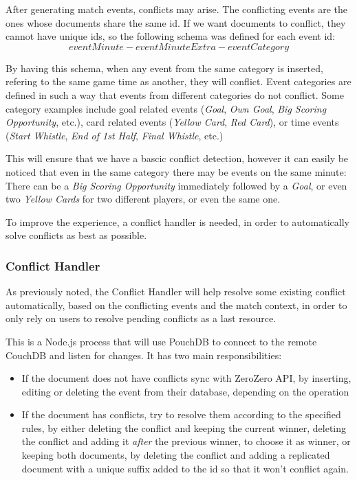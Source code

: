 After generating match events, conflicts may arise. The conflicting events are the ones whose documents share the same id. If we want documents to conflict, they cannot have unique ids, so the following schema was defined for each event id:
\begin{equation}
    eventMinute-eventMinuteExtra-eventCategory
\end{equation}

By having this schema, when any event from the same category is inserted, refering to the same game time as another, they will conflict. Event categories are defined in such a way that events from different categories do not conflict. Some category examples include goal related events (\textit{Goal}, \textit{Own Goal}, \textit{Big Scoring Opportunity}, etc.), card related events (\textit{Yellow Card}, \textit{Red Card}), or time events (\textit{Start Whistle}, \textit{End of 1st Half}, \textit{Final Whistle}, etc.)

This will ensure that we have a bascic conflict detection, however it can easily be noticed that even in the same category there may be events on the same minute: There can be a \textit{Big Scoring Opportunity} immediately followed by a \textit{Goal}, or even two \textit{Yellow Cards} for two different players, or even the same one.

To improve the experience, a conflict handler is needed, in order to automatically solve conflicts as best as possible.

\subsubsection{Conflict Handler}

As previously noted, the Conflict Handler will help resolve some existing conflict automatically, based on the conflicting events and the match context, in order to only rely on users to resolve pending conflicts as a last resource.

This is a Node.js process that will use PouchDB to connect to the remote CouchDB and listen for changes. It has two main responsibilities:
\begin{itemize}
    \item If the document does not have conflicts sync with ZeroZero API, by inserting, editing or deleting the event from their database, depending on the operation
    \item If the document has conflicts, try to resolve them according to the specified rules, by either deleting the conflict and keeping the current winner, deleting the conflict and adding it \textit{after} the previous winner, to choose it as winner, or keeping both documents, by deleting the conflict and adding a replicated document with a unique suffix added to the id so that it won't conflict again.
\end{itemize}

